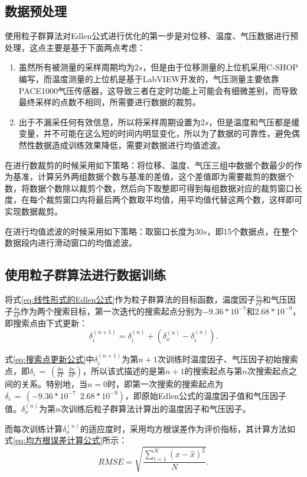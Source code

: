 \subsection{数据预处理}
使用粒子群算法对Edlen公式进行优化的第一步是对位移、温度、气压数据进行预处理，这点主要是基于下面两点考虑：
\begin{enumerate}
  \item 虽然所有被测量的采样周期均为$2s$，但是由于位移测量的上位机采用C-SHOP编写，而温度测量的上位机是基于LabVIEW开发的，气压测量主要依靠PACE1000气压传感器，这导致三者在定时功能上可能会有细微差别，而导致最终采样的点数不相同，所需要进行数据的裁剪。
  \item 出于不漏采任何有效信息，所以将采样周期设置为$2s$，但是温度和气压都是缓变量，并不可能在这么短的时间内明显变化，所以为了数据的可靠性，避免偶然性数据造成训练效果降低，需要对数据进行均值滤波。
\end{enumerate}
在进行数裁剪的时候采用如下策略：将位移、温度、气压三组中数据个数最少的作为基准，计算另外两组数据个数与基准的差值，这个差值即为需要裁剪的数据个数，将数据个数除以裁剪个数，然后向下取整即可得到每组数据对应的裁剪窗口长度，在每个裁剪窗口内将最后两个数取平均值，用平均值代替这两个数，这样即可实现数据裁剪。

在进行均值滤波的时候采用如下策略：取窗口长度为$30s$，即15个数据点，在整个数据段内进行滑动窗口的均值滤波。

\subsection{使用粒子群算法进行数据训练}
将式\eqref{eq:线性形式的Edlen公式}作为粒子群算法的目标函数，温度因子$\frac{\delta n}{\delta T}$和气压因子$\frac{\delta n}{\delta P}$作为两个搜索目标，第一次迭代的搜索起点分别为$-9.36*10^{-7}$和$2.68*10^{-9}$，即搜索点由下式更新：
\begin{equation}\label{eq:搜索点更新公式}
  \delta^{(n+1)}_i = \delta^{(n)}_i+(\delta^{(n)}_o-\delta^{(n)}_i).
  \end{equation}

式\eqref{eq:搜索点更新公式}中$\delta^{(n+1)}_i$为第$n+1$次训练时温度因子、气压因子初始搜索点，即$\delta_i\,=\,(\frac{\delta n}{\delta T}\,\,\,\frac{\delta n}{\delta P})$，所以该式描述的是第$n+1$的搜索起点与第$n$次搜索起点之间的关系。特别地，当$n=0$时，即第一次搜索的搜索起点为$\delta_i\,=\,(-9.36*10^{-7}\,\,\,2.68*10^{-9})$，即原始Edlen公式的温度因子值和气压因子值。$\delta_o^{(n)}$为第$n$次训练后粒子群算法计算出的温度因子和气压因子。

而每次训练计算$\delta_o^{(n)}$的适应度时，采用均方根误差作为评价指标，其计算方法如式\eqref{eq:均方根误差计算公式}所示：
\begin{equation}\label{eq:均方根误差计算公式}
  RMSE = \sqrt{\frac{\sum_{i=1}^{N}(x-\widehat x)^2}{N}}.
  \end{equation}


